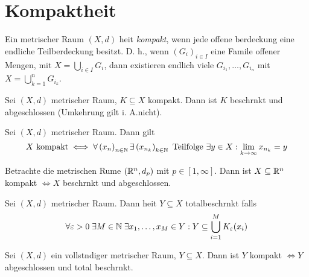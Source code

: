 \section{Kompaktheit}
\begin{definition}
	Ein metrischer Raum \((X, d)\) hei\s t \textit{kompakt}, wenn jede offene \Us berdeckung eine endliche Teil\us berdeckung besitzt. D. h., wenn $(G_i)_{i\in I}$ eine Famile offener Mengen, mit \(X = \bigcup_{i\in I} G_i\), dann existieren endlich viele \(G_{i_1},\ldots, G_{i_n}\) mit \(X = \bigcup_{k=1}^n G_{i_k}\).
\end{definition}
\begin{theorem}
	Sei \((X ,d)\) metrischer Raum, \(K\subseteq X\) kompakt. Dann ist $K$ beschr\as nkt und abgeschlossen (Umkehrung gilt i. A.nicht).\label{kompakt_beschr_abg}
\end{theorem}
\begin{theorem}
	Sei \((X,d)\) metrischer Raum. Dann gilt
	\[X \text{ kompakt}\iff \forall \left (x_n\right )_{n\in \mathbb{N}} \exists \left(x_{n_k}\right)_{k\in\mathbb{N}} \text{ Teilfolge } \exists y \in X: \lim_{k \to\infty} x_{n_k} = y\]
\end{theorem}
\begin{theorem}
	Betrachte die metrischen R\as ume \((\mathbb{R}^n, d_p)\) mit $p\in[1,\infty]$. Dann ist \(X\subseteq \mathbb{R}^n\) kompakt \(\iff X\) beschr\as nkt und abgeschlossen.
\end{theorem}
\begin{definition}
	Sei \((X,d)\) metrischer Raum. Dann hei\s t \(Y\subseteq X\) totalbeschr\as nkt falls
	\[\forall \varepsilon > 0 \;\exists M \in \mathbb{N}\;\exists x_1,\ldots, x_M \in Y: Y \subseteq \bigcup_{i=1}^M K_\varepsilon (x_i)\]
\end{definition}
\begin{theorem}
	Sei \((X, d)\) ein vollst\as ndiger metrischer Raum, \(Y\subseteq X\). Dann ist $Y$ kompakt $\iff Y$ abgeschlossen und total beschr\as nkt. 
\end{theorem}
